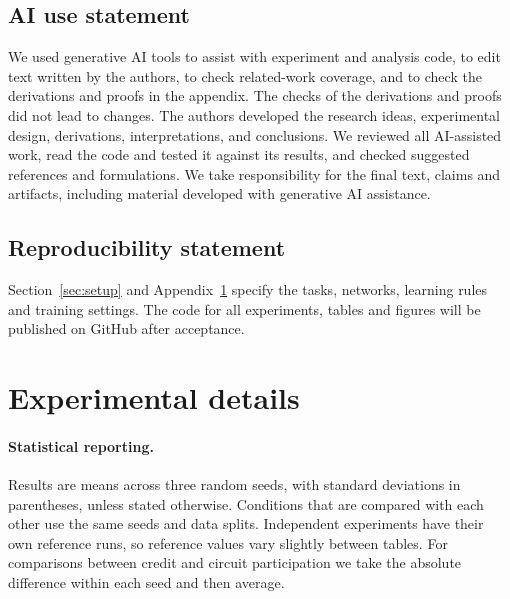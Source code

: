 \documentclass{article} %
\begin{document}
\subsection*{AI use statement}

We used generative AI tools to assist with experiment and analysis code, to edit text written by the authors, to check related-work coverage, and to check the derivations and proofs in the appendix. The checks of the derivations and proofs did not lead to changes. The authors developed the research ideas, experimental design, derivations, interpretations, and conclusions. We reviewed all AI-assisted work, read the code and tested it against its results, and checked suggested references and formulations. We take responsibility for the final text, claims and artifacts, including material developed with generative AI assistance.

\subsection*{Reproducibility statement}

Section~\ref{sec:setup} and Appendix~\ref{app:repro} specify the tasks, networks, learning rules and training settings. The code for all experiments, tables and figures will be published on GitHub after acceptance.




\appendix

\section{Experimental details}
\label{app:repro}

\paragraph{Statistical reporting.} Results are means across three random seeds, with standard deviations in parentheses, unless stated otherwise. Conditions that are compared with each other use the same seeds and data splits. Independent experiments have their own reference runs, so reference values vary slightly between tables. For comparisons between credit and circuit participation we take the absolute difference within each seed and then average.
\end{document}
